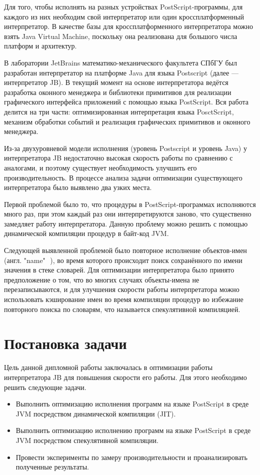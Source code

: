 \documentclass[14pt]{extarticle}
\begin{document}
	Для того, чтобы исполнять на разных устройствах PostScript-программы, для каждого из них необходим свой интерпретатор или один кроссплатформенный интерпретатор. В качестве базы для кроссплатформенного интерпретатора можно взять Java Virtual Machine, поскольку она реализована для большого числа платформ и архитектур.
	
	В лаборатории JetBrains математико-механического факультета СПбГУ был разработан интерпретатор на платформе Java для языка Postscript (далее --- интерпретатор JB). В текущий момент на основе интерпретатора ведётся разработка оконного менеджера и библиотеки примитивов для реализации графического интерфейса приложений с помощью языка PostScript. Вся работа делится на три части: оптимизированная интерпретация языка PosctScript, механизм обработки событий и реализация графических примитивов и оконного менеджера.
	
	Из-за двухуровневой модели исполнения (уровень Postscript и уровень Java) у интерпретатора JB недостаточно высокая скорость работы по сравнению с  аналогами, и поэтому существует необходимость улучшить его производительность. В процессе анализа задачи оптимизации существующего интерпретатора было выявлено два узких места. 
	
	Первой проблемой было то, что процедуры в PostScript-программах исполняются много раз, при этом каждый раз они интерпретируются заново, что существенно замедляет работу интерпретатора. Данную проблему можно решить с помощью динамической компиляции процедур в байт-код JVM.
	
	Следующей выявленной проблемой было повторное исполнение объектов-имен (англ. "name"\,~\cite{PLRM}), во время которого происходит поиск сохранённого по имени значения в стеке словарей. Для оптимизации интерпретатора было принято предположение о том, что во многих случаях объекты-имена не перезаписываются, и для улучшения скорости работы интерпретатора можно использовать кэширование имен во время компиляции процедур во избежание повторного поиска по словарям, что называется спекулятивной компиляцией.
	\pagebreak
	\section{Постановка задачи} 
	Цель данной дипломной работы заключалась в оптимизации работы интерпретатора JB для повышения скорости его работы. Для этого необходимо решить следующие задачи.
	\begin{itemize}
		\item Выполнить оптимизацию исполнения программ на языке PostScript в среде JVM посредством динамической компиляции (JIT).
		\item Выполнить оптимизацию исполнению программ на языке PostScript в среде JVM посредством спекулятивной компиляции.	
		\item Провести эксперименты по замеру производительности и проанализировать полученные результаты. 
	\end{itemize}
	
\end{document}
